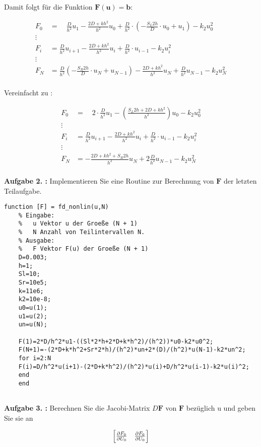 Damit folgt für die Funktion $\mathbf{F}(\mathbf{u})=\mathbf{b}$:

\begin{align*}
	F_0&= \quad \frac{D}{h^2}u_1-\frac{2D+kh^2}{h^2}u_0+\frac{D}{h^2}\cdot\left( -\frac{S_L 2h}{D}\cdot u_0+u_1\right) -k_2u_0^2\\
	\vdots \\
	F_i&= 	\frac{D}{h^2}u_{i+1}-\frac{2D+kh^2}{h^2}u_i+\frac{D}{h^2}\cdot u_{i-1} -k_2u_i^2\\
	\vdots \\
	F_N &= \frac{D}{h^2}\left( -\frac{S_R2h}{D}\cdot u_N+u_{N-1}\right) -\frac{2D+kh^2}{h^2}u_N+\frac{D}{h^2} u_{N-1}-k_2u^2_N\\
\end{align*}

\begin{qed}
	Vereinfacht zu :
	
	\begin{align*}
		F_0&= \quad 2\cdot \frac{D}{h^2}u_1-\left( \frac{S_L2h+2D+kh^2}{h^2}\right) u_0 -k_2u_0^2\\
		\vdots \\
		F_i&= 	\frac{D}{h^2}u_{i+1}-\frac{2D+kh^2}{h^2}u_i+\frac{D}{h^2}\cdot u_{i-1} -k_2u_i^2\\
		\vdots \\
		F_N &= -\frac{2D+kh^2+S_R2h}{h^2}u_N+2\frac{D}{h^2}u_{N-1}-k_2u^2_N\\
	\end{align*}
\end{qed}

\begin{mybox}
	\textbf{Aufgabe 2. :} Implementieren Sie eine Routine zur Berechnung von $\mathbf{F}$ der letzten Teilaufgabe.\cite{Prof.Dr.AndreasZeiser.April2021}
\end{mybox}

\begin{lstlisting}[style=Matlab-editor]
	function [F] = fd_nonlin(u,N)
	% Eingabe:
	%   u Vektor u der Groeße (N + 1)
	%   N Anzahl von Teilintervallen N.
	% Ausgabe:
	%   F Vektor F(u) der Groeße (N + 1) 
	D=0.003;
	h=1;
	Sl=10;
	Sr=10e5;
	k=11e6;
	k2=10e-8;
	u0=u(1);
	u1=u(2);
	un=u(N);
	
	F(1)=2*D/h^2*u1-((Sl*2*h+2*D+k*h^2)/(h^2))*u0-k2*u0^2;
	F(N+1)=-(2*D+k*h^2+Sr*2*h)/(h^2)*un+2*(D)/(h^2)*u(N-1)-k2*un^2;
	for i=2:N
	F(i)=D/h^2*u(i+1)-(2*D+k*h^2)/(h^2)*u(i)+D/h^2*u(i-1)-k2*u(i)^2;
	end
	end
	
\end{lstlisting}

\begin{mybox}
	\textbf{Aufgabe 3. :} Berechnen Sie die Jacobi-Matrix $D\mathbf{F}$ von $\mathbf{F}$ bezüglich u und geben Sie sie an
\end{mybox}
\begin{equation}
	\begin{bmatrix}
		\pdv{F_0}{U_0} & \pdv{F_0}{U_0}  \\
		
	\end{bmatrix}
\end{equation}



